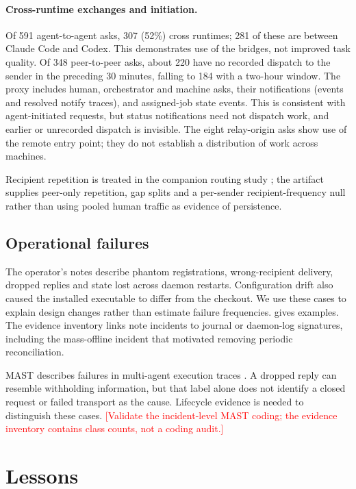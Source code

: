 \documentclass[10pt,twocolumn]{article}
\newcommand{\todo}[1]{\textcolor{red}{[#1]}}
\begin{document}
\paragraph{Cross-runtime exchanges and initiation.}
Of 591 agent-to-agent asks, 307 (52\%) cross runtimes; 281 of these are between Claude Code and Codex. This demonstrates use of the bridges, not improved task quality. Of 348 peer-to-peer asks, about 220 have no recorded dispatch to the sender in the preceding 30 minutes, falling to 184 with a two-hour window. The proxy includes human, orchestrator and machine asks, their notifications (events and resolved notify traces), and assigned-job state events. This is consistent with agent-initiated requests, but status notifications need not dispatch work, and earlier or unrecorded dispatch is invisible. The eight relay-origin asks show use of the remote entry point; they do not establish a distribution of work across machines.

Recipient repetition is treated in the companion routing study \citep{routerpaper2026}; the artifact supplies peer-only repetition, gap splits and a per-sender recipient-frequency null rather than using pooled human traffic as evidence of persistence.

\subsection{Operational failures}
\label{sec:incidents}

The operator's notes describe phantom registrations, wrong-recipient delivery, dropped replies and state lost across daemon restarts. Configuration drift also caused the installed executable to differ from the checkout. We use these cases to explain design changes rather than estimate failure frequencies.  gives examples. The evidence inventory links note incidents to journal or daemon-log signatures, including the mass-offline incident that motivated removing periodic reconciliation.

MAST describes failures in multi-agent execution traces \citep{cemri2025mast}. A dropped reply can resemble withholding information, but that label alone does not identify a closed request or failed transport as the cause. Lifecycle evidence is needed to distinguish these cases. \todo{Validate the incident-level MAST coding; the evidence inventory contains class counts, not a coding audit.}

\section{Lessons}
\label{sec:lessons}
\end{document}
